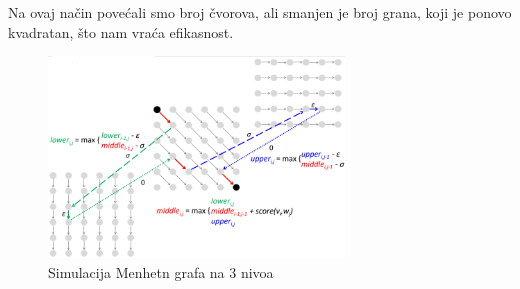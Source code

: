 Na ovaj način povećali smo broj čvorova, ali smanjen je broj grana, koji je ponovo kvadratan, što nam vraća efikasnost.

\begin{figure}[h!]
\centering
\includegraphics[width=0.7\textwidth]{poglavlja/5/slike/simulacija.png}
\caption{Simulacija Menhetn grafa na 3 nivoa}
\label{slika:simulacija}
\end{figure}


